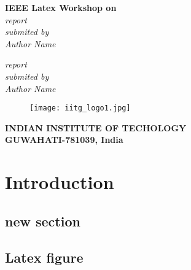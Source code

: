 \documentclass[a4paper,12pt]{report}
\begin{document}
	
	\begin{titlepage}
		\begin{center}
			\begin{spacing}{1}
					\textbf{\large IEEE Latex Workshop on \\}
				\textit{\large report} \\
				\vspace{3cm}
				\textit{\large submited by \\}
				\vspace{0.5cm}
				\textit{Author Name}
				\vspace{\fill}
			\end{spacing}
			\begin{spacing}{1}
				\textit{report} \\
				\vspace{4cm}
				\textit{submited by \\}
				\vspace{4cm}
				\textit{Author Name}
				\vspace{\fill}
			\end{spacing}
			\begin{figure}[h]
				\centering
				\texttt{[image: iitg\_logo1.jpg]}
			\end{figure}
			\begin{spacing}{1}
				\textbf{\large INDIAN INSTITUTE OF TECHOLOGY \\}
				\vspace{4mm}
				\textbf{\large GUWAHATI-781039, India}
				\vspace{4mm}
				\end{spacing}
		\end{center}
	\end{titlepage}
\clearpage
\setcounter{page}{2}


\tableofcontents
\listoftables
{}
\listoffigures
{}

\afterpage{\null\newpage}
\clearpage
{}

\chapter{Introduction}
\section{new section}
\section{Latex figure}
\end{document}
